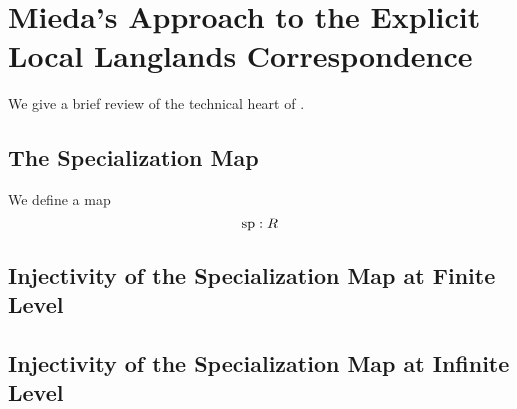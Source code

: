 \documentclass[../main.tex]{subfiles}
\begin{document}
\section{Mieda's Approach to the Explicit Local Langlands Correspondence} %
\label{sec:Mieda's Approach to the Explicit Local Langlands Correspondence}
We give a brief review of the technical heart of \cite{mieda2016geometric}.

\subsection{The Specialization Map} %
\label{sub:The Specialization Map}
We define a map 
\begin{equation*}
  \mathrm{sp}: R
\end{equation*}


\subsection{Injectivity of the Specialization Map at Finite Level} %
\label{sub:The Injectivity FinLevel}


\subsection{Injectivity of the Specialization Map at Infinite Level} %
\label{sub:Injectivity of the Specialization Map at Infinite Level}


\end{document}

